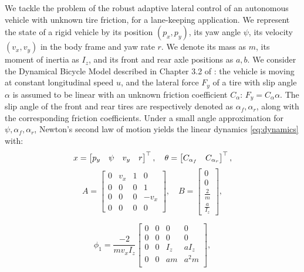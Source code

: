 \documentclass[letterpaper, 10 pt, conference]{ieeeconf}  %
\begin{document}
We tackle the problem of the robust adaptive lateral control of an autonomous vehicle with unknown tire friction, for a lane-keeping application. We represent the state of a rigid vehicle by its position $(p_x, p_y)$, its yaw angle $\psi$, its velocity $(v_x, v_y)$ in the body frame and yaw rate $r$. We denote its mass as $m$, its moment of inertia as $I_z$, and its front and rear axle positions as $a,b$. We consider the Dynamical Bicycle Model described in Chapter 3.2 of \cite{awan2014compensation}: the vehicle is moving at constant longitudinal speed $u$, and the lateral force $F_y$ of a tire with slip angle $\alpha$ is assumed to be linear with an unknown friction coefficient $C_\alpha$: $F_y = C_\alpha \alpha$. The slip angle of the front and rear tires are respectively denoted as $\alpha_f, \alpha_r$, along with the corresponding friction coefficients.
Under a small angle approximation for $\psi, \alpha_f, \alpha_r$, Newton's second law of motion yields the linear dynamics \eqref{eq:dynamics} with:
\begin{align*}
x = \begin{bmatrix} {p_y} & {\psi} & {v_y} & {r} \end{bmatrix}^\top,\quad
\theta = \begin{bmatrix} C_{\alpha_f} & C_{\alpha_r}\end{bmatrix}^\top,
\end{align*}
\[
A = \begin{bmatrix}
0 & v_x & 1 & 0 \\
0 & 0 & 0 & 1 \\
0 & 0 & 0 & - v_x \\
0 & 0 & 0 & 0
\end{bmatrix},\quad
B =
\begin{bmatrix}
0 \\
0 \\
\frac{2}{m} \\
\frac{a}{I_z}
\end{bmatrix},
\]

\[
\phi_1 = \frac{-2}{m v_x I_z}\begin{bmatrix}
0 & 0 & 0 & 0 \\
0 & 0 & 0 & 0 \\
0 & 0 & I_z & a I_z \\
0 & 0 & a m & a^2 m \\
\end{bmatrix},
\]
\end{document}
